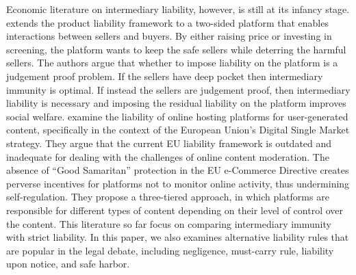 Economic literature on intermediary liability, however, is still at its infancy stage.  
\cite{hua2021holding} extends the product liability framework to a two-sided platform that enables interactions between sellers and buyers. By either raising price or investing in screening, the platform wants to keep the safe sellers while deterring the harmful sellers. The authors argue that whether to impose liability on the platform is a judgement proof problem. If the sellers have deep pocket then intermediary immunity is optimal. If instead the sellers are judgement proof, then intermediary liability is necessary and imposing the residual liability on the platform improves social welfare.  
\cite{buiten2020rethinking} examine the liability of online hosting platforms for user-generated content, specifically in the context of the European Union's Digital Single Market strategy. They argue that the current EU liability framework is outdated and inadequate for dealing with the challenges of online content moderation. The absence of ``Good Samaritan'' protection in the EU e-Commerce Directive creates perverse incentives for platforms not to monitor online activity, thus undermining self-regulation. 
They propose a three-tiered approach, in which platforms are responsible for different types of content depending on their level of control over the content. 
This literature so far focus on comparing intermediary immunity with strict liability. In this paper, we also examines alternative liability rules that are popular in the legal debate, including negligence, must-carry rule, liability upon notice, and safe harbor. 